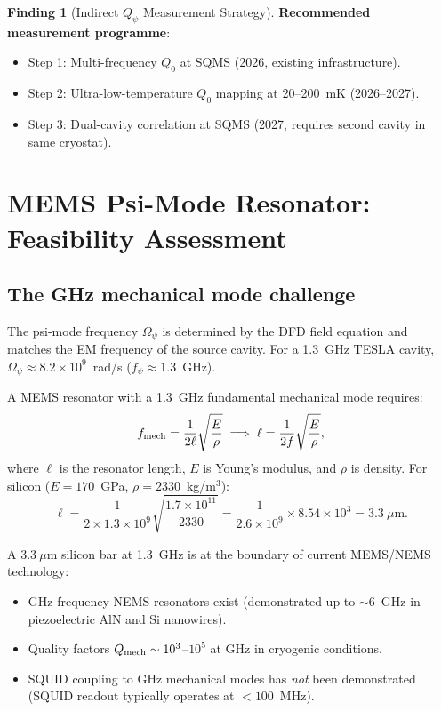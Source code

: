 \documentclass[11pt]{article}
\newcommand{\Opsi}{\Omega_\psi}
\newcommand{\ee}[1]{\times 10^{#1}}
\newcommand{\Qpsi}{Q_\psi}
\theoremstyle{definition}
\newtheorem{finding}[theorem]{Finding}
\theoremstyle{remark}
\begin{document}
\begin{finding}[Indirect $\Qpsi$ Measurement Strategy]
\textbf{Recommended measurement programme}:
\begin{itemize}[nosep]
\item Step 1: Multi-frequency $Q_0$ at SQMS (2026, existing infrastructure).
\item Step 2: Ultra-low-temperature $Q_0$ mapping at 20--200~mK (2026--2027).
\item Step 3: Dual-cavity correlation at SQMS (2027, requires second cavity
  in same cryostat).
\end{itemize}
\end{finding}

\section{MEMS Psi-Mode Resonator: Feasibility Assessment}
\label{sec:MEMS_feasibility}

\subsection{The GHz mechanical mode challenge}
\label{ssec:GHz_challenge}

The psi-mode frequency $\Opsi$ is determined by the DFD field equation
and matches the EM frequency of the source cavity. For a 1.3~GHz TESLA
cavity, $\Opsi \approx 8.2\ee{9}$~rad/s ($f_\psi \approx 1.3$~GHz).

A MEMS resonator with a 1.3~GHz fundamental mechanical mode requires:
\begin{equation}
f_{\rm mech} = \frac{1}{2\ell}\sqrt{\frac{E}{\rho}}
\implies \ell = \frac{1}{2f}\sqrt{\frac{E}{\rho}},
\label{eq:MEMS_frequency}
\end{equation}
where $\ell$ is the resonator length, $E$ is Young's modulus, and $\rho$
is density. For silicon ($E = 170$~GPa, $\rho = 2330$~kg/m$^3$):
\begin{equation}
\ell = \frac{1}{2\times 1.3\ee{9}}\sqrt{\frac{1.7\ee{11}}{2330}}
= \frac{1}{2.6\ee{9}}\times 8.54\ee{3}
= 3.3~\mu\text{m}.
\label{eq:MEMS_size}
\end{equation}

A $3.3~\mu$m silicon bar at 1.3~GHz is at the boundary of current
MEMS/NEMS technology:
\begin{itemize}[nosep]
\item GHz-frequency NEMS resonators exist (demonstrated up to $\sim 6$~GHz
  in piezoelectric AlN and Si nanowires).
\item Quality factors $Q_{\rm mech} \sim 10^3$--$10^5$ at GHz in
  cryogenic conditions.
\item SQUID coupling to GHz mechanical modes has \emph{not} been
  demonstrated (SQUID readout typically operates at $<100$~MHz).
\end{itemize}
\end{document}
